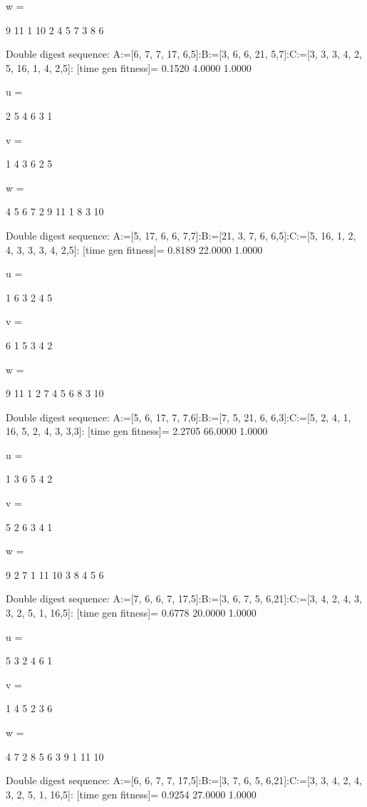 w =

     9    11     1    10     2     4     5     7     3     8     6

Double digest sequence:
A:=[6, 7, 7, 17, 6,5]:B:=[3, 6, 6, 21, 5,7]:C:=[3, 3, 3, 4, 2, 5, 16, 1, 4, 2,5]:
[time gen fitness]=
    0.1520    4.0000    1.0000


u =

     2     5     4     6     3     1


v =

     1     4     3     6     2     5


w =

     4     5     6     7     2     9    11     1     8     3    10

Double digest sequence:
A:=[5, 17, 6, 6, 7,7]:B:=[21, 3, 7, 6, 6,5]:C:=[5, 16, 1, 2, 4, 3, 3, 3, 4, 2,5]:
[time gen fitness]=
    0.8189   22.0000    1.0000


u =

     1     6     3     2     4     5


v =

     6     1     5     3     4     2


w =

     9    11     1     2     7     4     5     6     8     3    10

Double digest sequence:
A:=[5, 6, 17, 7, 7,6]:B:=[7, 5, 21, 6, 6,3]:C:=[5, 2, 4, 1, 16, 5, 2, 4, 3, 3,3]:
[time gen fitness]=
    2.2705   66.0000    1.0000


u =

     1     3     6     5     4     2


v =

     5     2     6     3     4     1


w =

     9     2     7     1    11    10     3     8     4     5     6

Double digest sequence:
A:=[7, 6, 6, 7, 17,5]:B:=[3, 6, 7, 5, 6,21]:C:=[3, 4, 2, 4, 3, 3, 2, 5, 1, 16,5]:
[time gen fitness]=
    0.6778   20.0000    1.0000


u =

     5     3     2     4     6     1


v =

     1     4     5     2     3     6


w =

     4     7     2     8     5     6     3     9     1    11    10

Double digest sequence:
A:=[6, 6, 7, 7, 17,5]:B:=[3, 7, 6, 5, 6,21]:C:=[3, 3, 4, 2, 4, 3, 2, 5, 1, 16,5]:
[time gen fitness]=
    0.9254   27.0000    1.0000


